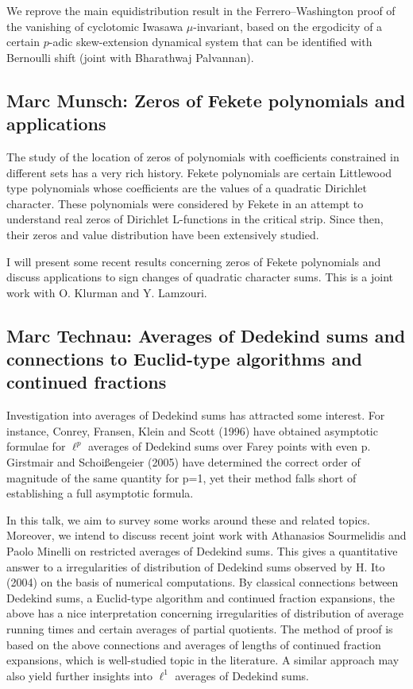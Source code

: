 \documentclass[15pt]{article}
\begin{document}
We reprove the main equidistribution result in the Ferrero--Washington proof of the vanishing of cyclotomic Iwasawa $\mu$-invariant, based on the ergodicity of a certain $p$-adic skew-extension dynamical system that can be identified with Bernoulli shift (joint with Bharathwaj Palvannan).  

\subsection*{Marc Munsch: Zeros of Fekete polynomials and applications}

The study of the location of zeros of polynomials with coefficients 
constrained in different sets has a very rich history. Fekete 
polynomials are certain Littlewood type polynomials whose coefficients 
are the values of a quadratic Dirichlet character. These polynomials 
were considered by Fekete in an attempt to understand real zeros of 
Dirichlet L-functions in the critical strip. Since then, their zeros 
and value distribution have been extensively studied.

I will present some recent results concerning zeros of Fekete 
polynomials and discuss applications to sign changes of quadratic 
character sums. This is a joint work with O. Klurman and Y. Lamzouri.


\subsection*{Marc Technau: Averages of Dedekind sums and connections to Euclid-type algorithms and continued fractions}
Investigation into averages of Dedekind sums has attracted some interest. For instance, Conrey, Fransen, Klein and Scott (1996) have obtained asymptotic formulae for $\ell^p$ averages of Dedekind sums over Farey points with even p. Girstmair and Schoi\ss engeier (2005) have determined the correct order of magnitude of the same quantity for p=1, yet their method falls short of establishing a full asymptotic formula.

In this talk, we aim to survey some works around these and related topics. Moreover, we intend to discuss recent joint work with Athanasios Sourmelidis and Paolo Minelli on restricted averages of Dedekind sums. This gives a quantitative answer to a irregularities of distribution of Dedekind sums observed by H. Ito (2004) on the basis of numerical computations. By classical connections between Dedekind sums, a Euclid-type algorithm and continued fraction expansions, the above has a nice interpretation concerning irregularities of distribution of average running times and certain averages of partial quotients. The method of proof is based on the above connections and averages of lengths of continued fraction expansions, which is well-studied topic in the literature. A similar approach may also yield further insights into $\ell^1$ averages of Dedekind sums.
\end{document}
